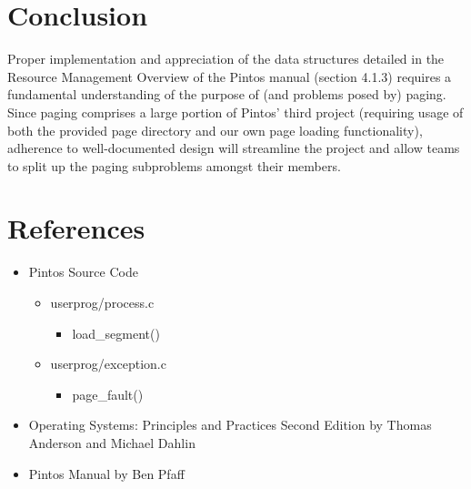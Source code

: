 \documentclass[11pt, letterpaper]{article}
\begin{document}
\section*{Conclusion}
	Proper implementation and appreciation of the data structures detailed in the Resource Management Overview of the Pintos manual (section 4.1.3) requires a fundamental understanding of the purpose of (and problems posed by) paging. Since paging comprises a large portion of Pintos' third project (requiring usage of both the provided page directory and our own page loading functionality), adherence to well-documented design will streamline the project and allow teams to split up the paging subproblems amongst their members.
\pagebreak
\begin{appendices}

%

\pagebreak

%

\end{appendices}

\pagebreak

\section*{References}
	
\begin{itemize}
\item Pintos Source Code
	\begin{itemize}
	\item userprog/process.c
	\begin{itemize}
		\item load\_segment()	
	\end{itemize}
	\item userprog/exception.c
	\begin{itemize}
		\item page\_fault()
	\end{itemize}
	\end{itemize}
\item Operating Systems: Principles and Practices Second Edition by Thomas Anderson and Michael Dahlin
\item Pintos Manual by Ben Pfaff
\end{itemize}
\end{document}
